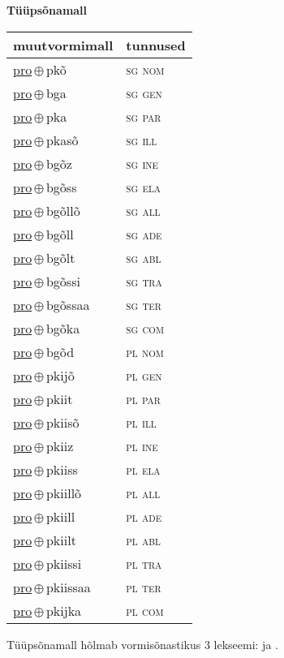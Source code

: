 

\vspace{3.5em}
\noindent \begin{minipage}{\textwidth}
\noindent \textbf{Tüüpsõnamall \,}\\

\begin{sideways}
\begin{tabular}{l l}
muutvormimall & tunnused \\
\hline
\underline{pro}\,$\oplus$\,pkõ & \textsc{ sg nom } \\
\underline{pro}\,$\oplus$\,bga & \textsc{ sg gen } \\
\underline{pro}\,$\oplus$\,pka & \textsc{ sg par } \\
\underline{pro}\,$\oplus$\,pkasõ & \textsc{ sg ill } \\
\underline{pro}\,$\oplus$\,bgõz & \textsc{ sg ine } \\
\underline{pro}\,$\oplus$\,bgõss & \textsc{ sg ela } \\
\underline{pro}\,$\oplus$\,bgõllõ & \textsc{ sg all } \\
\underline{pro}\,$\oplus$\,bgõll & \textsc{ sg ade } \\
\underline{pro}\,$\oplus$\,bgõlt & \textsc{ sg abl } \\
\underline{pro}\,$\oplus$\,bgõssi & \textsc{ sg tra } \\
\underline{pro}\,$\oplus$\,bgõssaa & \textsc{ sg ter } \\
\underline{pro}\,$\oplus$\,bgõka & \textsc{ sg com } \\
\underline{pro}\,$\oplus$\,bgõd & \textsc{ pl nom } \\
\underline{pro}\,$\oplus$\,pkijõ & \textsc{ pl gen } \\
\underline{pro}\,$\oplus$\,pkiit & \textsc{ pl par } \\
\underline{pro}\,$\oplus$\,pkiisõ & \textsc{ pl ill } \\
\underline{pro}\,$\oplus$\,pkiiz & \textsc{ pl ine } \\
\underline{pro}\,$\oplus$\,pkiiss & \textsc{ pl ela } \\
\underline{pro}\,$\oplus$\,pkiillõ & \textsc{ pl all } \\
\underline{pro}\,$\oplus$\,pkiill & \textsc{ pl ade } \\
\underline{pro}\,$\oplus$\,pkiilt & \textsc{ pl abl } \\
\underline{pro}\,$\oplus$\,pkiissi & \textsc{ pl tra } \\
\underline{pro}\,$\oplus$\,pkiissaa & \textsc{ pl ter } \\
\underline{pro}\,$\oplus$\,pkijka & \textsc{ pl com } \\
\end{tabular}
\end{sideways}
\label{tab:tüüpsõnamall-propkõ}

\end{minipage}

 
\vspace{1em}
\noindent Tüüpsõnamall  hõlmab vormisõnastikus 3 lekseemi:  ja .
